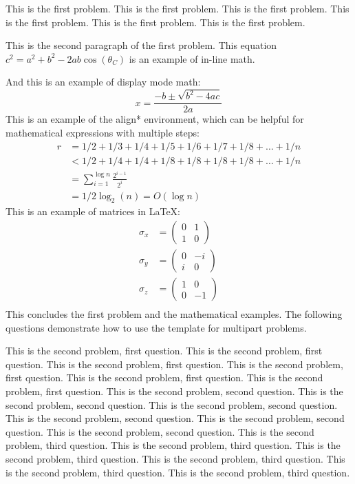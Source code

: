 \documentclass{cisXXX} %
\begin{document}
\maketitle
\HWproblem
This is the first problem.
This is the first problem.
This is the first problem.
This is the first problem.
This is the first problem.
This is the first problem.

This is the second paragraph of the first problem. This equation $c^2 = a^2 + b^2 - 2ab \cos(\theta_C)$ is an example of in-line math.

And this is an example of display mode math:
$$x = \frac{-b \pm \sqrt{b^2 - 4ac}}{2a}$$
This is an example of the align* environment, which can be helpful for mathematical expressions with multiple steps:
\begin{align*}
r &= 1/2 + 1/3 + 1/4 + 1/5 + 1/6 + 1/7 + 1/8 + \ldots + 1/n\\
&< 1/2 + 1/4 + 1/4 + 1/8 + 1/8 + 1/8 + 1/8 + \ldots + 1/n\\
&= \sum_{i = 1}^{\log n} \frac{2^{i - 1}}{2^i}\\
&= 1/2 \log_2 (n) = O(\log n)
\end{align*}
This is an example of matrices in \LaTeX:
\begin{align*}
	\sigma_x &=
		\begin{pmatrix}
		0 & 1 \\
		1 & 0
		\end{pmatrix} \\
	\sigma_y &=
		\begin{pmatrix}
		0 & -i \\
		i & 0
		\end{pmatrix} \\
	\sigma_z &=
		\begin{pmatrix}
		1 & 0 \\
		0 & -1
		\end{pmatrix} \\
\end{align*}
This concludes the first problem and the mathematical examples. The following questions demonstrate how to use the template for multipart problems.

\HWproblem
\HWsubproblem
This is the second problem, first question.
This is the second problem, first question.
This is the second problem, first question.
This is the second problem, first question.
This is the second problem, first question.
This is the second problem, first question.
\HWsubproblem
This is the second problem, second question.
This is the second problem, second question.
This is the second problem, second question.
This is the second problem, second question.
This is the second problem, second question.
This is the second problem, second question.
\HWsubproblem
This is the second problem, third question.
This is the second problem, third question.
This is the second problem, third question.
This is the second problem, third question.
This is the second problem, third question.
This is the second problem, third question.
\end{document}
